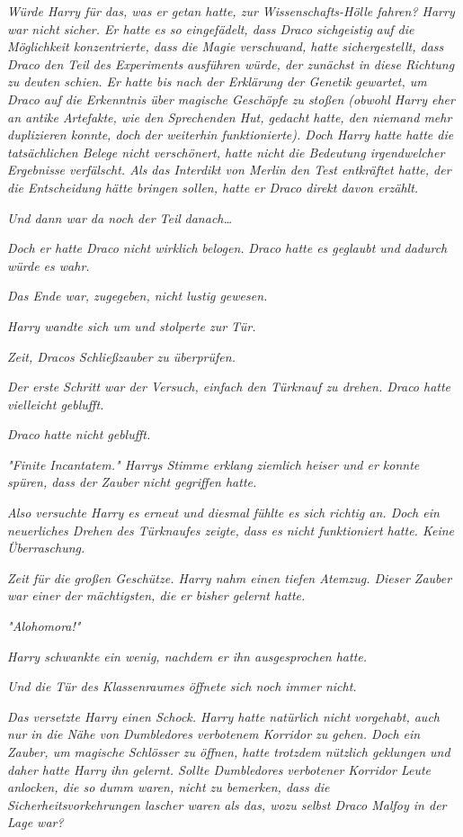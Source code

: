 {\emph{Würde Harry für das, was er getan hatte, zur Wissenschafts-Hölle fahren? Harry war nicht sicher. Er hatte es so eingefädelt, dass Draco} \emph{sichgeistig} \emph{auf die Möglichkeit konzentrierte, dass die Magie verschwand, hatte sichergestellt, dass Draco den Teil des Experiments ausführen würde, der zunächst in diese Richtung zu deuten schien. Er hatte bis nach der Erklärung der Genetik gewartet, um Draco auf die Erkenntnis über magische Geschöpfe zu stoßen (obwohl Harry eher an antike Artefakte, wie den Sprechenden Hut, gedacht hatte, den niemand mehr duplizieren konnte, doch der weiterhin funktionierte). Doch Harry hatte hatte die tatsächlichen Belege nicht verschönert, hatte nicht die Bedeutung irgendwelcher Ergebnisse verfälscht. Als das Interdikt von Merlin den Test entkräftet hatte, der die Entscheidung hätte bringen sollen, hatte er Draco direkt davon erzählt.}

\emph{Und dann war da noch der Teil} \emph{\emph{danach…}}

\emph{Doch er hatte Draco nicht wirklich} \emph{\emph{belogen.}} \emph{Draco hatte es geglaubt und} \emph{\emph{dadurch würde es wahr.}}

\emph{Das Ende war, zugegeben, nicht lustig gewesen.}

\emph{Harry wandte sich um und stolperte zur Tür.}

\emph{Zeit, Dracos Schließzauber zu überprüfen.}

\emph{Der erste Schritt war der Versuch, einfach den Türknauf zu drehen. Draco hatte vielleicht geblufft.}

\emph{Draco hatte nicht geblufft.}

\emph{"\emph{Finite Incantatem.}" Harrys Stimme erklang ziemlich heiser und er konnte spüren, dass der Zauber nicht gegriffen hatte.}

\emph{Also versuchte Harry es erneut und diesmal fühlte es sich richtig an. Doch ein neuerliches Drehen des Türknaufes zeigte, dass es nicht funktioniert hatte. Keine Überraschung.}

\emph{Zeit für die großen Geschütze. Harry nahm einen tiefen Atemzug. Dieser Zauber war einer der mächtigsten, die er bisher gelernt hatte.}

\emph{"\emph{Alohomora!}"}

\emph{Harry schwankte ein wenig, nachdem er ihn ausgesprochen hatte.}

\emph{Und die Tür des Klassenraumes öffnete sich noch immer nicht.}

\emph{Das versetzte Harry einen Schock. Harry hatte natürlich nicht vorgehabt, auch nur in die Nähe von Dumbledores verbotenem Korridor zu gehen. Doch ein Zauber, um magische Schlösser zu öffnen, hatte trotzdem nützlich geklungen und daher hatte Harry ihn gelernt. Sollte Dumbledores verbotener Korridor Leute anlocken, die so dumm waren, nicht zu bemerken, dass die Sicherheitsvorkehrungen lascher waren als das, wozu selbst Draco Malfoy in der Lage war?}

}
